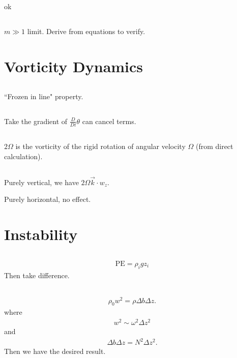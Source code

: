 \documentclass[11pt,letterpaper]{book}
\theoremstyle{definition}
\newcommand{\dsp}{\displaystyle}
\begin{document}
\subsection{}
ok

\subsection{}
$m\gg 1$ limit. Derive from equations to verify.

\section{Vorticity Dynamics}
\subsection{}
``Frozen in line" property.

\subsection{}
Take the gradient of $\dsp{\frac{D}{Dt}\theta}$ can cancel terms.

\subsection{}
$2\Omega$ is the vorticity of the rigid rotation of angular velocity $\Omega$ (from direct calculation). 

\subsection{}
Purely vertical, we have $2\Omega\vec{k}\cdot w_z$. 

Purely horizontal, no effect.

\section{Instability}
\subsection{}
\begin{align*}
    \text{PE} = \rho_i g z_i
\end{align*}
Then take difference.

\subsection{}
\begin{align*}
    \rho_0 w^2 = \rho\Delta b\Delta z.
\end{align*}
where
\begin{align*}
    w^2 \sim \omega^2\Delta z^2
\end{align*}
and
\begin{align*}
    \Delta b\Delta z = N^2\Delta z^2.
\end{align*}
Then we have the desired result.
\end{document}
